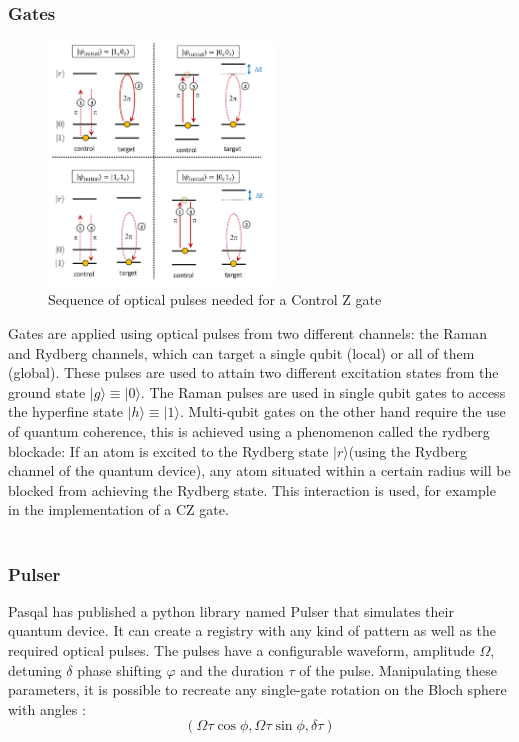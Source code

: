 \subsubsection{Gates}
\begin{figure}
  \centering
  \includegraphics[width=60mm]{./Images/CZbeams.png}
  \caption{Sequence of optical pulses needed for a Control Z gate} 
  \label{fig:CZ}

\end{figure}
Gates are applied using optical pulses from two different channels: the Raman and Rydberg channels, which can target a single qubit (local) or all of them (global). 
These pulses are used to attain two different excitation states from the ground state $|g \rangle \equiv|0 \rangle$. The Raman pulses are used in single qubit gates to access the hyperfine state $|h \rangle \equiv |1 \rangle$.
Multi-qubit gates on the other hand require the use of quantum coherence, this is achieved using a phenomenon called the rydberg blockade: If an atom is excited to the Rydberg state $|r \rangle$(using the Rydberg channel of the quantum device), any atom situated
within a certain radius will be blocked from achieving the Rydberg state. This interaction is used, for example in the implementation of a CZ gate. 
\\ \\
\subsubsection{Pulser}

Pasqal has published a python library named Pulser that simulates their quantum device. It can create a registry with any kind of pattern as well as the required optical pulses.
The pulses have a configurable waveform, amplitude $\Omega$, detuning $\delta$ phase shifting $\varphi$ and the duration $\tau$ of the pulse. Manipulating these parameters, it is possible to recreate any single-gate rotation on the
 Bloch sphere with angles :
 $$(\Omega\tau\cos\phi,\Omega\tau\sin\phi,\delta\tau)$$
